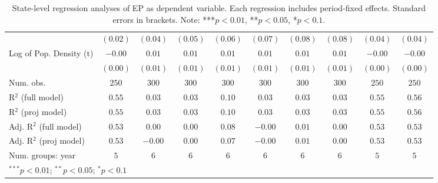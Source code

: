 \begin{table}
\begin{center}
\begin{tabular}{l c c c c c c c c c}
                              & $(0.02)$     & $(0.04)$ & $(0.05)$ & $(0.06)$ & $(0.07)$ & $(0.08)$ & $(0.08)$ & $(0.04)$     & $(0.04)$     \\
Log of Pop. Density (t)       & $-0.00$      & $0.01$   & $0.01$   & $0.01$   & $0.01$   & $0.01$   & $0.01$   & $-0.00$      & $-0.00$      \\
                              & $(0.00)$     & $(0.01)$ & $(0.01)$ & $(0.01)$ & $(0.01)$ & $(0.01)$ & $(0.01)$ & $(0.00)$     & $(0.00)$     \\
\hline
Num. obs.                     & $250$        & $300$    & $300$    & $300$    & $300$    & $300$    & $300$    & $250$        & $250$        \\
R$^2$ (full model)            & $0.55$       & $0.03$   & $0.03$   & $0.10$   & $0.03$   & $0.03$   & $0.03$   & $0.55$       & $0.56$       \\
R$^2$ (proj model)            & $0.55$       & $0.03$   & $0.03$   & $0.10$   & $0.03$   & $0.03$   & $0.03$   & $0.55$       & $0.56$       \\
Adj. R$^2$ (full model)       & $0.53$       & $0.00$   & $0.00$   & $0.08$   & $-0.00$  & $0.01$   & $0.00$   & $0.53$       & $0.53$       \\
Adj. R$^2$ (proj model)       & $0.53$       & $-0.00$  & $0.00$   & $0.07$   & $-0.00$  & $0.01$   & $0.00$   & $0.53$       & $0.53$       \\
Num. groups: year             & $5$          & $6$      & $6$      & $6$      & $6$      & $6$      & $6$      & $5$          & $5$          \\
\hline
\multicolumn{10}{l}{\scriptsize{$^{***}p<0.01$; $^{**}p<0.05$; $^{*}p<0.1$}}
\end{tabular}
\caption{State-level regression analyses of EP as dependent variable. Each regression includes period-fixed effects. Standard errors in brackets. Note: ***$p<0.01$, **$p<0.05$, *$p<0.1$.}
\label{tab:epi_2}
\end{center}
\end{table}

